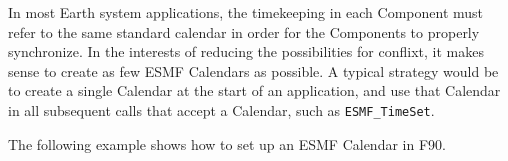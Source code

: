 
In most Earth system applications, the timekeeping in each Component 
must refer to the same standard calendar in order for the Components 
to properly synchronize.  In the interests of reducing the possibilities
for conflixt, it makes sense to create as few ESMF Calendars as possible.
A typical strategy would be to create a single Calendar at the start
of an application, and use that Calendar in all subsequent calls that
accept a Calendar, such as {\tt ESMF\_TimeSet}.

The following example shows how to set up an ESMF Calendar in F90.  
